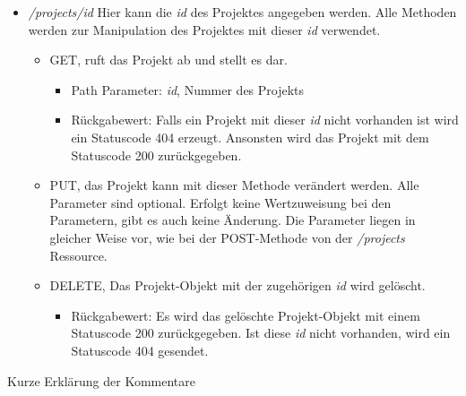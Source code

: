 \documentclass[12pt]{scrartcl}
\begin{document}
\begin{itemize}
\begin{itemize}
\begin{itemize}
					\end{itemize}
				\end{itemize}
				\item \emph{/projects/{id}} Hier kann die \emph{id} des Projektes angegeben werden. Alle Methoden werden zur Manipulation des Projektes mit dieser \emph{id} verwendet.
				\begin{itemize}
					\item GET, ruft das Projekt ab und stellt es dar. 
					\begin{itemize}
						\item Path Parameter: \emph{id}, Nummer des Projekts
						\item Rückgabewert: Falls ein Projekt mit dieser \emph{id} nicht vorhanden ist wird ein Statuscode 404 erzeugt. Ansonsten wird das Projekt mit dem Statuscode 200 zurückgegeben.
					\end{itemize}
					\item PUT, das Projekt kann mit dieser Methode verändert werden. Alle Parameter sind optional. Erfolgt keine Wertzuweisung bei den Parametern, gibt es auch keine Änderung. Die Parameter liegen in gleicher Weise vor, wie bei der POST-Methode von der \emph{/projects} Ressource.
					\item DELETE, Das Projekt-Objekt mit der zugehörigen \emph{id} wird gelöscht.
					\begin{itemize}
						\item Rückgabewert: Es wird das gelöschte Projekt-Objekt mit einem Statuscode 200 zurückgegeben. Ist diese \emph{id} nicht vorhanden, wird ein Statuscode 404 gesendet.
					\end{itemize}	
				\end{itemize}
		\end{itemize}
		Kurze Erklärung der Kommentare
\end{document}
